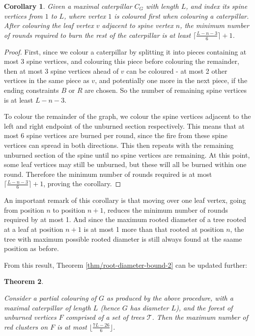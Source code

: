 \documentclass{mpaper}
\newtheorem{theorem}{Theorem}[section]
\newtheorem{corollary}[theorem]{Corollary}
\begin{document}
\begin{corollary}
  \label{cor/min_rounds_caterpillar}
  Given a maximal caterpillar $C_G$ with length $L$, and index its spine vertices from $1$ to $L$, where vertex $1$ is coloured first when colouring a caterpillar. After colouring the leaf vertex $v$ adjacent to spine vertex $n$, the minimum number of rounds required to burn the rest of the caterpillar is at least $\lceil \frac{L-n-3}{6} \rceil + 1$.
\end{corollary}
\begin{proof}
First, since we colour a caterpillar by splitting it into pieces containing at most 3 spine vertices, and colouring this piece before colouring the remainder, then at most 3 spine vertices ahead of $v$ can be coloured - at most 2 other vertices in the same piece as $v$, and potentially one more in the next piece, if the ending constraints $B$ or $R$ are chosen. So the number of remaining spine vertices is at least $L - n - 3$.

To colour the remainder of the graph, we colour the spine vertices adjacent to the left and right endpoint of the unburned section respectively. This means that at most 6 spine vertices are burned per round, since the fire from these spine vertices can spread in both directions. This then repeats with the remaining unburned section of the spine until no spine vertices are remaining. At this point, some leaf vertices may still be unburned, but these will all be burned within one round. Therefore the minimum number of rounds required is at most $\lceil \frac{L-n-3}{6} \rceil + 1$, proving the corollary.
\end{proof}

An important remark of this corollary is that moving over one leaf vertex, going from position $n$ to position $n+1$, reduces the minimum number of rounds required by at most 1. And since the maximum rooted diameter of a tree rooted at a leaf at position $n+1$ is at most 1 more than that rooted at position $n$, the tree with maximum possible rooted diameter is still always found at the saame position as before.

From this result, Theorem \ref{thm/root-diameter-bound-2} can be updated further:

\begin{theorem}
  \label{thm/root-diameter-bound-3}
  
  Consider a partial colouring of $G$ as produced by the above procedure, with a maximal caterpillar of length $L$ (hence $G$ has diameter $L$), and the forest of unburned vertices $F$ comprised of a set of trees $\mathcal{T}$. Then the maximum number of red clusters on $F$ is at most $\lfloor \frac{7L-26}{6} \rfloor$.
  
  \end{theorem}
\end{document}
